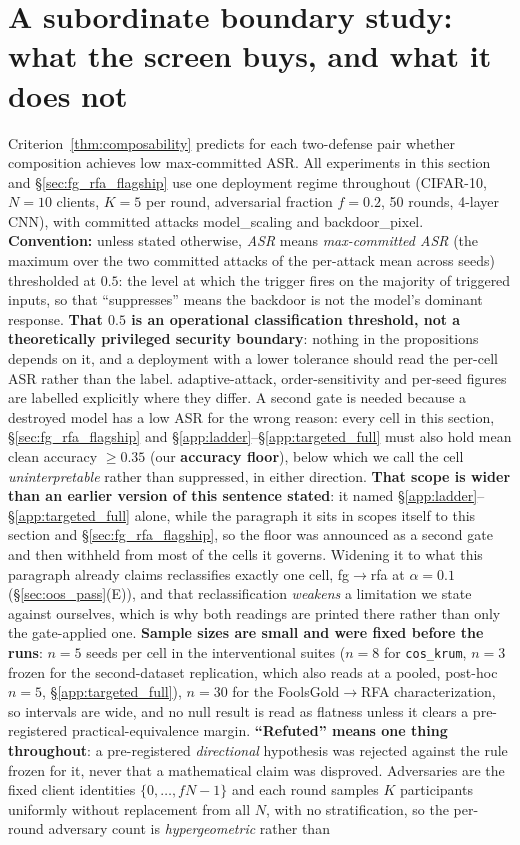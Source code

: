 \documentclass{article}
\begin{document}
\section{A subordinate boundary study: what the screen buys, and what it does not}
\label{sec:composability_validation}
\label{app:validation_full}

Criterion~\ref{thm:composability} predicts for each two-defense pair whether composition achieves low max-committed ASR. All experiments in this section and §\ref{sec:fg_rfa_flagship} use one deployment regime throughout (CIFAR-10, $N{=}10$ clients, $K{=}5$ per round, adversarial fraction $f{=}0.2$, 50 rounds, 4-layer CNN), with committed attacks model\_scaling and backdoor\_pixel. \textbf{Convention:} unless stated otherwise, \emph{ASR} means \emph{max-committed ASR} (the maximum over the two committed attacks of the per-attack mean across seeds) thresholded at $0.5$: the level at which the trigger fires on the majority of triggered inputs, so that ``suppresses'' means the backdoor is not the model's dominant response. \textbf{That $0.5$ is an operational classification threshold, not a theoretically privileged security boundary}: nothing in the propositions depends on it, and a deployment with a lower tolerance should read the per-cell ASR rather than the label. adaptive-attack, order-sensitivity and per-seed figures are labelled explicitly where they differ. A second gate is needed because a destroyed model has a low ASR for the wrong reason: every cell in this section, §\ref{sec:fg_rfa_flagship} and §\ref{app:ladder}--§\ref{app:targeted_full} must also hold mean clean accuracy $\ge 0.35$ (our \textbf{accuracy floor}), below which we call the cell \emph{uninterpretable} rather than suppressed, in either direction. \textbf{That scope is wider than an earlier version of this sentence stated}: it named §\ref{app:ladder}--§\ref{app:targeted_full} alone, while the paragraph it sits in scopes itself to this section and §\ref{sec:fg_rfa_flagship}, so the floor was announced as a second gate and then withheld from most of the cells it governs. Widening it to what this paragraph already claims reclassifies exactly one cell, fg$\to$rfa at $\alpha{=}0.1$ (§\ref{sec:oos_pass}(E)), and that reclassification \emph{weakens} a limitation we state against ourselves, which is why both readings are printed there rather than only the gate-applied one. \textbf{Sample sizes are small and were fixed before the runs}: $n{=}5$ seeds per cell in the interventional suites ($n{=}8$ for \texttt{cos\_krum}, $n{=}3$ frozen for the second-dataset replication, which also reads at a pooled, post-hoc $n{=}5$, §\ref{app:targeted_full}), $n{=}30$ for the FoolsGold$\to$RFA characterization, so intervals are wide, and no null result is read as flatness unless it clears a pre-registered practical-equivalence margin. \textbf{``Refuted'' means one thing throughout}: a pre-registered \emph{directional} hypothesis was rejected against the rule frozen for it, never that a mathematical claim was disproved. Adversaries are the fixed client identities $\{0,\dots,fN-1\}$ and each round samples $K$ participants uniformly without replacement from all $N$, with no stratification, so the per-round adversary count is \emph{hypergeometric} rather than 
\end{document}
